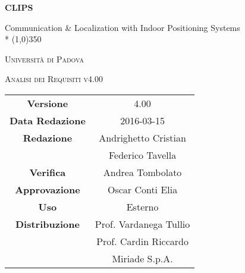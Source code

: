 \documentclass[a4paper,12pt]{article}
\author{Oscar Elia Conti, Marco Zanella}
\date{9/12/2015}
\begin{document}
	\begin{titlepage}
		\centering
		{\huge\bfseries CLIPS\par}
	Communication \& Localization with Indoor Positioning Systems \\*
	\line(1,0){350} \\
	{\scshape\LARGE Università di Padova \par}
	\vspace{1cm}
	{\scshape\Large Analisi dei Requisiti v4.00\par}
	\logo
	\newpage
		\begin{tabular}{c|c}
			{\hfill \textbf{Versione}} 		& 4.00				\\
			{\hfill\textbf{Data Redazione}} 	& 2016-03-15	  		\\
			{\hfill\textbf{Redazione}}		& Andrighetto Cristian 		\\
								& Federico Tavella 		\\
			{\hfill\textbf{Verifica}} 		& Andrea Tombolato		\\
			{\hfill\textbf{Approvazione}} 		& Oscar Conti Elia		\\
			{\hfill\textbf{Uso}} 			& Esterno			\\
			{\hfill\textbf{Distribuzione}} 		& Prof. Vardanega Tullio 	\\
								& Prof. Cardin Riccardo 	\\
								& Miriade S.p.A. 		\\
		\end{tabular}
	\end{titlepage}
	\newpage
		\pagestyle{myfront}
		

	\newpage
		\tableofcontents
	\newpage
		\listoftables
	\newpage
		\listoffigures
	\label{LastFrontPage}

	\newpage
	\pagestyle{mymain}
		
	\newpage
		
	\newpage
		
	\newpage
		
	\newpage
		
	\label{LastPage}
\end{document}
